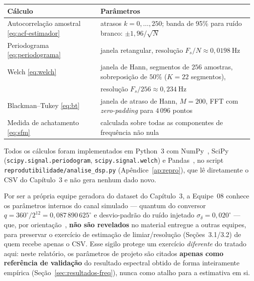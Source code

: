 \begin{center}\small
\begin{tabular}{@{}ll@{}}
\toprule
\textbf{Cálculo} & \textbf{Parâmetros}\\
\midrule
Autocorrelação amostral \eqref{eq:acf-estimador} & atrasos $k=0,\dots,250$; banda de 95\% para
  ruído branco: $\pm 1{,}96/\sqrt{N}$\\
Periodograma \eqref{eq:periodograma} & janela retangular, resolução $F_s/N \approx 0{,}0198\ \text{Hz}$\\
Welch \eqref{eq:welch} & janela de Hann, segmentos de $256$ amostras, sobreposição de $50\%$
  ($K=22$ segmentos),\\
  & resolução $F_s/256 \approx 0{,}234\ \text{Hz}$\\
Blackman--Tukey \eqref{eq:bt} & janela de atraso de Hann, $M=200$, FFT com \emph{zero-padding} para
  $4\,096$ pontos\\
Medida de achatamento \eqref{eq:sfm} & calculada sobre todas as componentes de frequência não nula\\
\bottomrule
\end{tabular}
\end{center}

Todos os cálculos foram implementados em Python~3 com NumPy~\cite{numpy2020},
SciPy (\texttt{scipy.signal.periodogram}, \texttt{scipy.signal.welch}) e
Pandas~\cite{mckinney2010}, no script \texttt{reprodutibilidade/analise\_dsp.py}
(Apêndice~\ref{ap:repro}), que lê diretamente o CSV do Capítulo~3 e não gera nenhum dado novo.

\begin{caixa}[title={Sobre o uso dos parâmetros de projeto do canal simulado}]
Por ser a própria equipe geradora do dataset do Capítulo~3, a Equipe~08 conhece os parâmetros
internos do canal simulado --- quantum do conversor $q=360^\circ/2^{12}=0{,}087\,890\,625^\circ$
e desvio-padrão do ruído injetado $\sigma_\delta=0{,}020^\circ$ --- que, por
orientação~\cite{geracaodadoslimiar}, \textbf{não são revelados} no material entregue a outras
equipes, para preservar o exercício de estimação de limiar/resolução (Seções~3.1/3.2) de quem
recebe apenas o CSV. Esse sigilo protege um exercício \emph{diferente} do tratado aqui: neste
relatório, os parâmetros de projeto são citados \textbf{apenas como referência de validação} do
resultado espectral obtido de forma inteiramente empírica (Seção~\ref{sec:resultados-freq}), nunca
como atalho para a estimativa em si.
\end{caixa}

